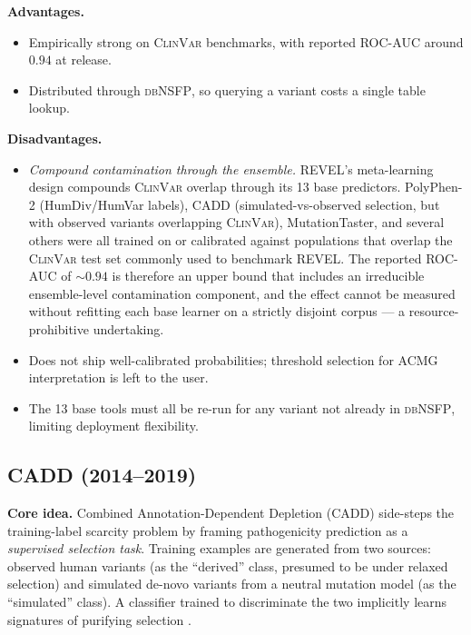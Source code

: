 \documentclass[11pt,a4paper,oneside]{report}
\begin{document}
\textbf{Advantages.}
\begin{itemize}[leftmargin=2em, itemsep=0.15em]
  \item Empirically strong on \textsc{ClinVar} benchmarks,
    with reported ROC-AUC around $0.94$ at release.
  \item Distributed through \textsc{dbNSFP}, so querying a
    variant costs a single table lookup.
\end{itemize}

\textbf{Disadvantages.}
\begin{itemize}[leftmargin=2em, itemsep=0.15em]
  \item \emph{Compound contamination through the ensemble.}
    REVEL's meta-learning design compounds \textsc{ClinVar}
    overlap through its 13 base predictors. PolyPhen-2
    (HumDiv/HumVar labels), CADD (simulated-vs-observed
    selection, but with observed variants overlapping
    \textsc{ClinVar}), MutationTaster, and several others
    were all trained on or calibrated against populations
    that overlap the \textsc{ClinVar} test set commonly
    used to benchmark REVEL. The reported ROC-AUC of
    $\sim$$0.94$ is therefore an upper bound that includes
    an irreducible ensemble-level contamination component,
    and the effect cannot be measured without refitting
    each base learner on a strictly disjoint corpus ---
    a resource-prohibitive undertaking.
  \item Does not ship well-calibrated probabilities;
    threshold selection for ACMG interpretation is left
    to the user.
  \item The 13 base tools must all be re-run for any variant
    not already in \textsc{dbNSFP}, limiting deployment
    flexibility.
\end{itemize}

\subsection{CADD (2014--2019) \texorpdfstring{\citep{rentzsch2019cadd}}{(Rentzsch et al., 2019)}}
\label{sec:rw-cadd}

\textbf{Core idea.} Combined Annotation-Dependent
Depletion (CADD) side-steps the training-label scarcity
problem by framing pathogenicity prediction as a
\emph{supervised selection task}. Training examples are
generated from two sources: observed human variants (as
the ``derived'' class, presumed to be under relaxed
selection) and simulated de-novo variants from a neutral
mutation model (as the ``simulated'' class). A
classifier trained to discriminate the two implicitly
learns signatures of purifying selection
\citep{rentzsch2019cadd}.
\end{document}
